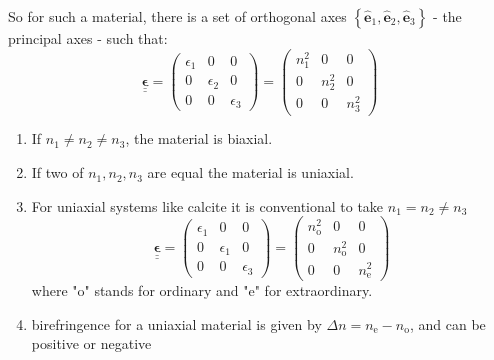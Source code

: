 \documentclass[12pt,a4paper]{article}
\begin{document}
So for such a material, there is a set of orthogonal axes $\left\{\widehat{\boldsymbol{e}}_1, \widehat{\boldsymbol{e}}_2, \widehat{\boldsymbol{e}}_3\right\}$ - the principal axes - such that:
$$
\underline{\underline{\boldsymbol{\epsilon}}}=\left(\begin{array}{ccc}
\epsilon_1 & 0 & 0 \\
0 & \epsilon_2 & 0 \\
0 & 0 & \epsilon_3
\end{array}\right)=\left(\begin{array}{ccc}
n_1^2 & 0 & 0 \\
0 & n_2^2 & 0 \\
0 & 0 & n_3^2
\end{array}\right)
$$
\begin{enumerate}
    \item If $n_1 \neq n_2 \neq n_3$, the material is biaxial.
    \item If two of $n_1, n_2, n_3$ are equal the material is uniaxial.
    \item For uniaxial systems like calcite it is conventional to take $n_1=n_2 \neq n_3$
    $$
    \underline{\underline{\boldsymbol{\epsilon}}}=\left(\begin{array}{ccc}
    \epsilon_1 & 0 & 0 \\
    0 & \epsilon_1 & 0 \\
    0 & 0 & \epsilon_3
    \end{array}\right)=\left(\begin{array}{ccc}
    n_{\mathrm{o}}^2 & 0 & 0 \\
    0 & n_{\mathrm{o}}^2 & 0 \\
    0 & 0 & n_{\mathrm{e}}^2
    \end{array}\right)
    $$ where "o" stands for ordinary and "e" for extraordinary.
    \item birefringence for a uniaxial material is given by $\Delta n=n_{\mathrm{e}}-n_{\mathrm{o}}$, and can be positive or negative
\end{enumerate}
\end{document}
